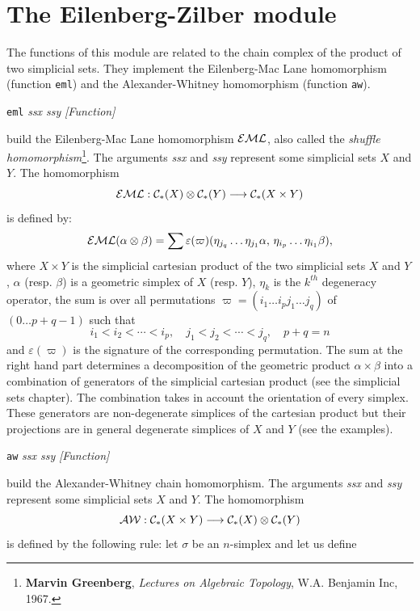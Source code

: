 \chapter{The Eilenberg-Zilber module}

The functions of this module are related to the chain complex of the
pro\-duct of two simplicial sets.
They implement the Eilenberg-Mac Lane homomorphism (function {\tt eml}) 
and the Alexander-Whitney homomorphism  (function {\tt aw}).
\vskip 0.45cm
{\parindent=0mm
{\leftskip=5mm 
{\tt eml} {\em ssx ssy} \hfill {\em [Function]} \par}
{\leftskip=15mm 
build the Eilenberg-Mac Lane homomorphism $\cal EML$, also called 
the {\em shuffle homomorphism}\footnote{{\bf Marvin Greenberg}, {\it Lectures on Algebraic Topology}, 
W.A. Benjamin Inc, 1967.}.
The arguments {\em ssx} and {\em ssy} represent some simplicial sets $X$ and $Y$.
The homomorphism 
$${\cal EML}:{\cal C}_*(X) \otimes {\cal C}_*(Y) \longrightarrow {\cal C}_*(X \times Y)$$
is defined by:
$${\cal EML}(\alpha \otimes \beta)= 
 \sum{{\varepsilon(\varpi)}(\eta_{j_q}\ldots \eta_{j_1}\alpha,\, \eta_{i_p}\ldots \eta_{i_1}\beta)},$$
where $X\times Y$ is the simplicial cartesian product of the two simplicial sets $X$ and $Y$,  $\alpha$ (resp. $\beta$)
is a geometric simplex of $X$ (resp. $Y$), $\eta_k$ is the $k^{th}$ degeneracy operator, the sum is
over all permutations $\varpi= (i_1 \ldots i_p j_1 \ldots j_q)$ of $(0 \ldots p+q-1)$ such that
$$ i_1 < i_2 < \cdots < i_p,\quad j_1 < j_2 < \cdots < j_q, \quad p+q=n$$
and $\varepsilon(\varpi)$ is the signature of the corresponding permutation. The sum at the right hand part determines
a decomposition of the geometric product $\alpha \times \beta$ into a combination of generators of the
simplicial cartesian product (see the simplicial sets chapter). The combination takes in account the orientation of every
simplex. These generators are non-degenerate simplices of the cartesian product but their projections 
are in general degenerate simplices of $X$ and $Y$ (see the examples). \par}
{\leftskip=5mm 
{\tt aw} {\em ssx ssy} \hfill {\em [Function]} \par}
{\leftskip=15mm 
build the Alexander-Whitney chain homomorphism.
The arguments {\em ssx} and {\em ssy} represent some simplicial sets $X$ and $Y$.
The homomorphism 
$${\cal AW}:{\cal C}_*(X \times Y) \longrightarrow {\cal C}_*(X) \otimes {\cal C}_*(Y)$$
is defined by the following rule: let $\sigma$ be an $n$-simplex and let us define
}}
